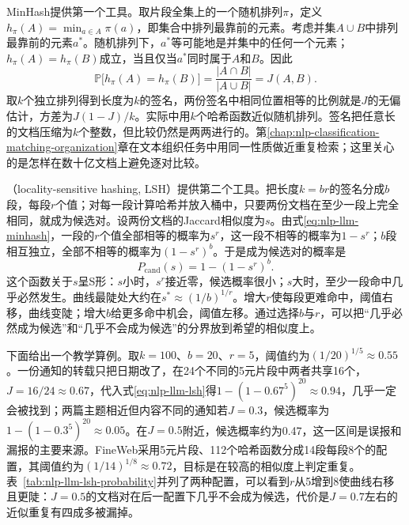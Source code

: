 MinHash提供第一个工具。取片段全集上的一个随机排列$\pi$，定义$h_\pi(A)=\min_{a\in A}\pi(a)$，即集合中排列最靠前的元素。考虑并集$A\cup B$中排列最靠前的元素$a^\ast$。随机排列下，$a^\ast$等可能地是并集中的任何一个元素；$h_\pi(A)=h_\pi(B)$成立，当且仅当$a^\ast$同时属于$A$和$B$。因此
\begin{equation}
  \mathbb P\bigl[h_\pi(A)=h_\pi(B)\bigr]=\frac{|A\cap B|}{|A\cup B|}=J(A,B).
  \label{eq:nlp-llm-minhash}
\end{equation}
取$k$个独立排列得到长度为$k$的签名，两份签名中相同位置相等的比例就是$J$的无偏估计，方差为$J(1-J)/k$。实际中用$k$个哈希函数近似随机排列。签名把任意长的文档压缩为$k$个整数，但比较仍然是两两进行的。第\ref{chap:nlp-classification-matching-organization}章在文本组织任务中用同一性质做近重复检索；这里关心的是怎样在数十亿文档上避免逐对比较。

（locality-sensitive hashing, LSH）提供第二个工具。把长度$k=br$的签名分成$b$段，每段$r$个值；对每一段计算哈希并放入桶中，只要两份文档在至少一段上完全相同，就成为候选对。设两份文档的Jaccard相似度为$s$。由式\eqref{eq:nlp-llm-minhash}，一段的$r$个值全部相等的概率为$s^r$，这一段不相等的概率为$1-s^r$；$b$段相互独立，全部不相等的概率为$(1-s^r)^b$。于是成为候选对的概率是
\begin{equation}
  P_{\mathrm{cand}}(s)=1-(1-s^r)^b.
  \label{eq:nlp-llm-lsh}
\end{equation}
这个函数关于$s$呈S形：$s$小时，$s^r$接近零，候选概率很小；$s$大时，至少一段命中几乎必然发生。曲线最陡处大约在$s^\ast\approx(1/b)^{1/r}$。增大$r$使每段更难命中，阈值右移，曲线变陡；增大$b$给更多命中机会，阈值左移。通过选择$b$与$r$，可以把“几乎必然成为候选”和“几乎不会成为候选”的分界放到希望的相似度上。

下面给出一个教学算例。取$k=100$、$b=20$、$r=5$，阈值约为$(1/20)^{1/5}\approx0.55$。一份通知的转载只把日期改了，在24个不同的5元片段中两者共享16个，$J=16/24\approx0.67$，代入式\eqref{eq:nlp-llm-lsh}得$1-(1-0.67^5)^{20}\approx0.94$，几乎一定会被找到；两篇主题相近但内容不同的通知若$J=0.3$，候选概率为$1-(1-0.3^5)^{20}\approx0.05$。在$J=0.5$附近，候选概率约为0.47，这一区间是误报和漏报的主要来源。FineWeb采用5元片段、112个哈希函数分成14段每段8个的配置，其阈值约为$(1/14)^{1/8}\approx0.72$，目标是在较高的相似度上判定重复。表~\ref{tab:nlp-llm-lsh-probability}并列了两种配置，可以看到$r$从5增到8使曲线右移且更陡：$J=0.5$的文档对在后一配置下几乎不会成为候选，代价是$J=0.7$左右的近似重复有四成多被漏掉。

